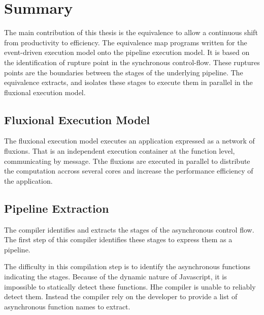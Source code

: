\section{Summary}

The main contribution of this thesis is the equivalence to allow a continuous shift from productivity to efficiency.
The equivalence map programs written for the event-driven execution model onto the pipeline execution model.
It is based on the identification of rupture point in the synchronous control-flow.
These ruptures points are the boundaries between the stages of the underlying pipeline.
The equivalence extracts, and isolates these stages to execute them in parallel in the fluxional execution model.


\subsection{Fluxional Execution Model} \label{chapter7:conclusion:model}

The fluxional execution model executes an application expressed as a network of fluxions.
That is an independent execution container at the function level, communicating by message.
Tthe fluxions are executed in parallel to distribute the computation accross several cores and increase the performance efficiency of the application.

\subsection{Pipeline Extraction} \label{chapter7:conclusion:extraction}

The compiler identifies and extracts the stages of the asynchronous control flow.
The first step of this compiler identifies these stages to express them as a pipeline.

The difficulty in this compilation step is to identify the asynchronous functions indicating the stages.
Because of the dynamic nature of Javascript, it is impossible to statically detect these functions.
Hhe compiler is unable to reliably detect them.
Instead the compiler rely on the developer to provide a list of asynchronous function names to extract.

